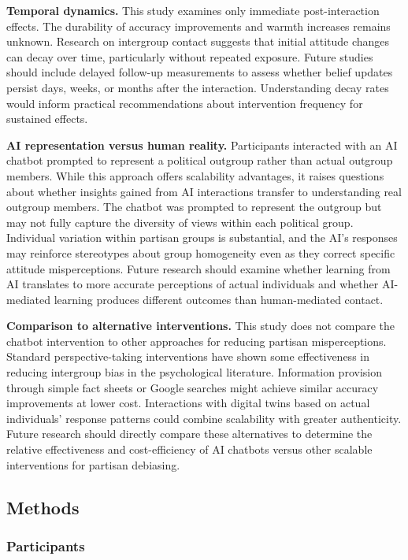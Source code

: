 \documentclass[
  11pt,
  oneside]{article}
\begin{document}
\textbf{Temporal dynamics.} This study examines only immediate
post-interaction effects. The durability of accuracy improvements and
warmth increases remains unknown. Research on intergroup contact
suggests that initial attitude changes can decay over time, particularly
without repeated exposure. Future studies should include delayed
follow-up measurements to assess whether belief updates persist days,
weeks, or months after the interaction. Understanding decay rates would
inform practical recommendations about intervention frequency for
sustained effects.

\textbf{AI representation versus human reality.} Participants interacted
with an AI chatbot prompted to represent a political outgroup rather
than actual outgroup members. While this approach offers scalability
advantages, it raises questions about whether insights gained from AI
interactions transfer to understanding real outgroup members. The
chatbot was prompted to represent the outgroup but may not fully capture
the diversity of views within each political group. Individual variation
within partisan groups is substantial, and the AI's responses may
reinforce stereotypes about group homogeneity even as they correct
specific attitude misperceptions. Future research should examine whether
learning from AI translates to more accurate perceptions of actual
individuals and whether AI-mediated learning produces different outcomes
than human-mediated contact.

\textbf{Comparison to alternative interventions.} This study does not
compare the chatbot intervention to other approaches for reducing
partisan misperceptions. Standard perspective-taking interventions have
shown some effectiveness in reducing intergroup bias in the
psychological literature. Information provision through simple fact
sheets or Google searches might achieve similar accuracy improvements at
lower cost. Interactions with digital twins based on actual individuals'
response patterns could combine scalability with greater authenticity.
Future research should directly compare these alternatives to determine
the relative effectiveness and cost-efficiency of AI chatbots versus
other scalable interventions for partisan debiasing.

\subsection{Methods}\label{methods}

\subsubsection{Participants}\label{participants}
\end{document}
